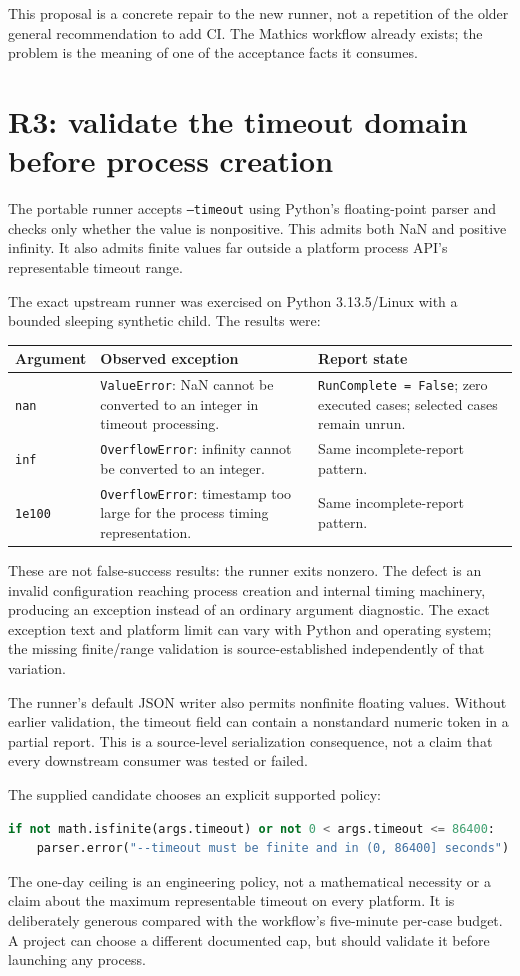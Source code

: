 \documentclass[11pt,a4paper]{article}
\newcommand{\code}[1]{\texttt{#1}}
\begin{document}
This proposal is a concrete repair to the new runner, not a repetition of the older general recommendation to add CI. The Mathics workflow already exists; the problem is the meaning of one of the acceptance facts it consumes.

\section{R3: validate the timeout domain before process creation}
The portable runner accepts \code{--timeout} using Python's floating-point parser and checks only whether the value is nonpositive. This admits both NaN and positive infinity. It also admits finite values far outside a platform process API's representable timeout range.\cite{runner}

The exact upstream runner was exercised on Python 3.13.5/Linux with a bounded sleeping synthetic child. The results were:
\begin{longtable}{@{}L{0.13\textwidth}L{0.31\textwidth}L{0.47\textwidth}@{}}
\toprule
Argument & Observed exception & Report state\\
\midrule
\code{nan} & \code{ValueError}: NaN cannot be converted to an integer in timeout processing. & \code{RunComplete = False}; zero executed cases; selected cases remain unrun.\\
\code{inf} & \code{OverflowError}: infinity cannot be converted to an integer. & Same incomplete-report pattern.\\
\code{1e100} & \code{OverflowError}: timestamp too large for the process timing representation. & Same incomplete-report pattern.\\
\bottomrule
\end{longtable}
These are not false-success results: the runner exits nonzero. The defect is an invalid configuration reaching process creation and internal timing machinery, producing an exception instead of an ordinary argument diagnostic. The exact exception text and platform limit can vary with Python and operating system; the missing finite/range validation is source-established independently of that variation.

The runner's default JSON writer also permits nonfinite floating values. Without earlier validation, the timeout field can contain a nonstandard numeric token in a partial report. This is a source-level serialization consequence, not a claim that every downstream consumer was tested or failed.

The supplied candidate chooses an explicit supported policy:
\begin{lstlisting}[language=Python]
if not math.isfinite(args.timeout) or not 0 < args.timeout <= 86400:
    parser.error("--timeout must be finite and in (0, 86400] seconds")
\end{lstlisting}
The one-day ceiling is an engineering policy, not a mathematical necessity or a claim about the maximum representable timeout on every platform. It is deliberately generous compared with the workflow's five-minute per-case budget. A project can choose a different documented cap, but should validate it before launching any process.
\end{document}
